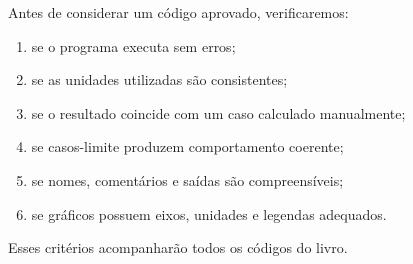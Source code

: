 Antes de considerar um código aprovado, verificaremos:

\begin{enumerate}
  \item se o programa executa sem erros;
  \item se as unidades utilizadas são consistentes;
  \item se o resultado coincide com um caso calculado manualmente;
  \item se casos-limite produzem comportamento coerente;
  \item se nomes, comentários e saídas são compreensíveis;
  \item se gráficos possuem eixos, unidades e legendas adequados.
\end{enumerate}

Esses critérios acompanharão todos os códigos do livro.
